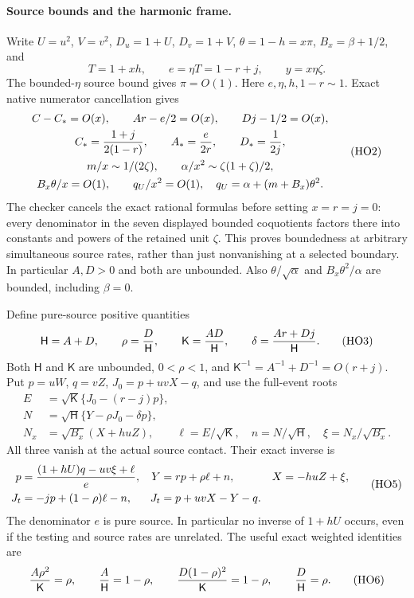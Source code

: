 \paragraph{Source bounds and the harmonic frame.}
Write $U=u^2$, $V=v^2$, $D_u=1+U$, $D_v=1+V$,
$\theta=1-h=x\pi$, $B_x=\beta+1/2$, and
\[
 T=1+xh,\qquad e=\eta T=1-r+j,\qquad y=x\eta\zeta .
 \tag{HO1}
\]
The bounded-$\eta$ source bound gives $\pi=O(1)$.
Here $e,\eta,h,1-r\sim1$. Exact native numerator cancellation gives
\[
 \begin{gathered}
 C-C_* =O(x),\qquad Ar-e/2=O(x),\qquad Dj-1/2=O(x),\\
 C_*={1+j\over2(1-r)},\qquad A_*={e\over2r},\qquad D_*={1\over2j},\\
 m/x\sim1/(2\zeta),\qquad
 \alpha/x^2\sim\zeta(1+\zeta)/2,\\
 B_x\theta/x=O(1),\qquad
 q_U/x^2=O(1),\quad q_U=\alpha+(m+B_x)\theta^2 .
 \end{gathered}
 \tag{HO2}
\]
The checker cancels the exact rational formulas before setting
$x=r=j=0$: every denominator in the seven displayed bounded
coquotients factors there into constants and powers of the retained
unit $\zeta$. This proves boundedness at arbitrary simultaneous
source rates, rather than just nonvanishing at a selected boundary.
In particular $A,D>0$ and both are unbounded.
Also $\theta/\sqrt\alpha$ and $B_x\theta^2/\alpha$ are bounded,
including $\beta=0$.

Define pure-source positive quantities
\[
 \mathsf H=A+D,\qquad \rho={D\over\mathsf H},\qquad
 \mathsf K={AD\over\mathsf H},\qquad
 \delta={Ar+Dj\over\mathsf H}.
 \tag{HO3}
\]
Both $\mathsf H$ and $\mathsf K$ are unbounded,
$0<\rho<1$, and
$\mathsf K^{-1}=A^{-1}+D^{-1}=O(r+j)$.
Put $p=uW$, $q=vZ$, $J_0=p+uvX-q$, and use the full-event roots
\[
 \begin{aligned}
 E&=\sqrt{\mathsf K}\{J_0-(r-j)p\},\\
 N&=\sqrt{\mathsf H}\{Y-\rho J_0-\delta p\},\\
 N_x&=\sqrt{B_x}(X+huZ),\qquad
 \ell=E/\sqrt{\mathsf K},\quad n=N/\sqrt{\mathsf H},
 \quad \xi=N_x/\sqrt{B_x}.
 \end{aligned}
 \tag{HO4}
\]
All three vanish at the actual source contact. Their exact inverse is
\[
 \begin{aligned}
 p&={(1+hU)q-uv\xi+\ell\over e},&
 Y&=rp+\rho\ell+n,&X&=-huZ+\xi,\\
 J_t&=-jp+(1-\rho)\ell-n,&J_t&=p+uvX-Y-q .
 \end{aligned}
 \tag{HO5}
\]
The denominator $e$ is pure source. In particular no inverse of
$1+hU$ occurs, even if the testing and source rates are unrelated.
The useful exact weighted identities are
\[
 {A\rho^2\over\mathsf K}=\rho,\qquad
 {A\over\mathsf H}=1-\rho,\qquad
 {D(1-\rho)^2\over\mathsf K}=1-\rho,\qquad
 {D\over\mathsf H}=\rho .
 \tag{HO6}
\]

